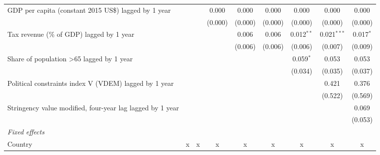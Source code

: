\begin{tabular}{lcccccccc}
   GDP per capita (constant 2015 US\$) lagged by 1 year      &               &               & 0.000         & 0.000          & 0.000          & 0.000          & 0.000          & 0.000\\   
                                                             &               &               & (0.000)       & (0.000)        & (0.000)        & (0.000)        & (0.000)        & (0.000)\\   
   Tax revenue (\% of GDP) lagged by 1 year                  &               &               &               & 0.006          & 0.006          & 0.012$^{**}$   & 0.021$^{***}$  & 0.017$^{*}$\\   
                                                             &               &               &               & (0.006)        & (0.006)        & (0.006)        & (0.007)        & (0.009)\\   
   Share of population >65 lagged by 1 year                  &               &               &               &                &                & 0.059$^{*}$    & 0.053          & 0.053\\   
                                                             &               &               &               &                &                & (0.034)        & (0.035)        & (0.037)\\   
   Political constraints index V (VDEM) lagged by 1 year     &               &               &               &                &                &                & 0.421          & 0.376\\   
                                                             &               &               &               &                &                &                & (0.522)        & (0.569)\\   
   Stringency value modified, four-year lag lagged by 1 year &               &               &               &                &                &                &                & 0.069\\   
                                                             &               &               &               &                &                &                &                & (0.053)\\   
   \emph{Fixed effects}\\
   Country                                                   & x             & x             & x             & x              & x              & x              & x              & x\\  

\end{tabular}

